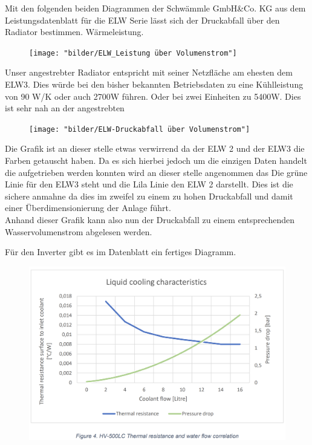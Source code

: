 Mit den folgenden beiden Diagrammen der Schwämmle GmbH\&Co. KG aus dem Leistungsdatenblatt für die ELW Serie lässt sich der Druckabfall über den Radiator bestimmen.  Wärmeleistung.

\begin{figure}[h]
	\centering
	\texttt{[image: "bilder/ELW\_Leistung über Volumenstrom"]}
	\caption{}
	\label{fig:elwleistung-uber-volumenstrom}
\end{figure}

Unser angestrebter Radiator entspricht mit seiner Netzfläche am ehesten dem ELW3. Dies würde bei den bisher bekannten Betriebsdaten zu eine Kühlleistung von 90 W/K oder auch 2700W führen. Oder bei zwei Einheiten zu 5400W. Dies ist sehr nah an der angestrebten

\begin{figure}[h]
	\centering
	\texttt{[image: "bilder/ELW-Druckabfall über Volumenstrom"]}
	\caption{}
	\label{fig:elw-druckabfall-uber-volumenstrom}
\end{figure}

Die Grafik ist an dieser stelle etwas verwirrend da der ELW 2 und der ELW3 die Farben getauscht haben. Da es sich hierbei jedoch um die einzigen Daten handelt die aufgetrieben werden konnten wird an dieser stelle angenommen das Die grüne Linie für den ELW3 steht und die Lila Linie den ELW 2 darstellt. Dies ist die sichere anmahne da dies im zweifel zu einem zu hohen Druckabfall und damit einer Überdimensionierung der Anlage führt.\\
Anhand dieser Grafik kann also nun der Druckabfall zu einem entsprechenden Wasservolumenstrom abgelesen werden.

Für den Inverter gibt es im Datenblatt ein fertiges Diagramm.
\begin{figure}[h]
	\centering
	\includegraphics[width=0.7\linewidth]{"bilder/Druckabfall DTI500LC"}
	\caption{}
	\label{fig:cooling-characteristik}
\end{figure}

